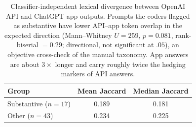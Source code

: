 \begin{table}[t]\centering\small
\caption{Classifier-independent lexical divergence between OpenAI API and ChatGPT app outputs. Prompts the coders flagged as substantive have lower API--app token overlap in the expected direction (Mann--Whitney $U=259$, $p=0.081$, rank-biserial $=0.29$; directional, not significant at $.05$), an objective cross-check of the manual taxonomy. App answers are about $3\times$ longer and carry roughly twice the hedging markers of API answers.}
\label{tab:lexical}
\begin{tabular}{lcc}
\toprule
Group & Mean Jaccard & Median Jaccard \\
\midrule
Substantive ($n=17$) & 0.189 & 0.181 \\
Other ($n=43$) & 0.234 & 0.225 \\
\bottomrule
\end{tabular}
\end{table}